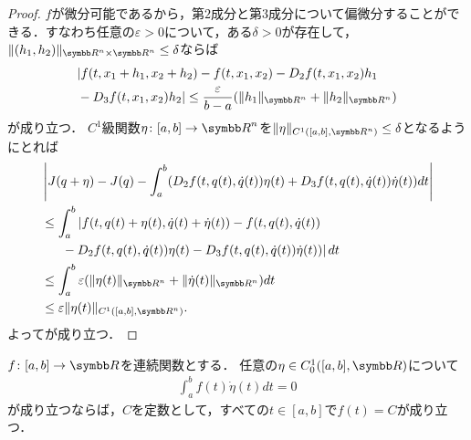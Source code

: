 \documentclass{ltjsarticle}
\begin{document}
\begin{proof}
\(f\)が微分可能であるから，第\(2\)成分と第\(3\)成分について偏微分することができる．すなわち任意の\(\varepsilon > 0\)について，ある\(\delta > 0\)が存在して，\(\lVert (h_1, h_2) \rVert_{{\Real}^n \times {\Real}^n} \leq \delta\)ならば
\begin{align*}
    & \lvert f(t, x_1 + h_1, x_2 + h_2) - f(t, x_1, x_2) - D_2 f(t, x_1, x_2) h_1 \\
    & {} \mathbin{-} D_3 f (t, x_1, x_2) h_2  \rvert \leq \frac{\varepsilon}{b - a} ( \lVert h_1 \rVert_{{\Real}^n} + \lVert h_2 \rVert_{{\Real}^n} )
\end{align*}
が成り立つ．
\(C^1\)級関数\(\eta \colon [a, b] \to {\Real}^n\)を\(\lVert \eta \rVert_{C^1([a, b], {\Real}^n)} \leq \delta\)となるようにとれば
\begin{align*}
    &\left\lvert J(q + \eta) - J(q) - \int_a^b  (D_2 f(t, q(t), \dot{q}(t)) \eta(t) + D_3 f (t, q(t), \dot{q}(t)) \dot{\eta}(t))  dt \right\rvert \\
    &\leq \int_a^b \left\lvert f(t, q(t) + \eta(t), \dot{q}(t) + \dot{\eta}(t)) - f(t, q(t), \dot{q}(t)) \right. \\
    & \mathrel{\hphantom{=}}{} \left. {} \mathbin{-} D_2 f(t, q(t), \dot{q}(t)) \eta(t) - D_3 f (t, q(t), \dot{q}(t)) \dot{\eta}(t)) \right\rvert dt \\
    &\leq \int_a^b \varepsilon (\lVert \eta(t) \rVert_{{\Real}^n} + \lVert \dot{\eta}(t) \rVert_{{\Real}^n}) dt \\
    &\leq \varepsilon \lVert \eta(t) \rVert_{C^1([a, b], {\Real}^n)}.
\end{align*}
よってが成り立つ．
\end{proof}

\begin{thmbox}
\begin{theorem}[（変分法の基本補題）]
\(f \colon [a, b] \to {\Real}\)を連続関数とする．
任意の\(\eta \in C^1_0([a, b], {\Real})\)について
\begin{align}
    \int_a^b f(t) \dot{\eta}(t) dt = 0
    \label{fundamental-lemma-assumption}
\end{align}
が成り立つならば，\(C\)を定数として，すべての\(t \in [a, b]\)で\(f(t) = C\)が成り立つ．
\end{theorem}
\end{thmbox}
\end{document}
